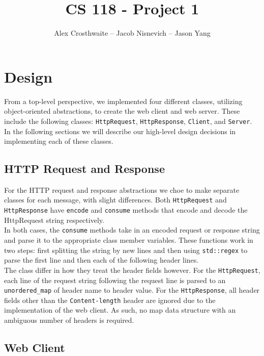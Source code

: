 \documentclass{article}
\begin{document}
\title{CS 118 - Project 1}
\author{Alex Crosthwaite -- Jacob Nisnevich -- Jason Yang}

\maketitle

\section{Design}

From a top-level perspective, we implemented four different classes, utilizing object-oriented abstractions, to create the web client and web server. These include the following classes: \texttt{HttpRequest}, \texttt{HttpResponse}, \texttt{Client}, and \texttt{Server}. In the following sections we will describe our high-level design decisions in implementing each of these classes.

\subsection{HTTP Request and Response}

For the HTTP request and response abstractions we choe to make separate classes for each message, with slight differences. Both \texttt{HttpRequest} and \texttt{HttpResponse} have \texttt{encode} and \texttt{consume} methods that encode and decode the HttpRequest string respectively. \\

\noindent
In both cases, the \texttt{consume} methods take in an encoded request or response string and parse it to the appropriate class member variables. These functions work in two steps: first splitting the string by new lines and then using \texttt{std::regex} to parse the first line and then each of the following header lines. \\

\noindent
The class differ in how they treat the header fields however. For the \texttt{HttpRequest}, each line of the request string following the request line is parsed to an \texttt{unordered\_map} of header name to header value. For the \texttt{HttpResponse}, all header fields other than the \texttt{Content-length} header are ignored due to the implementation of the web client. As such, no map data structure with an ambiguous number of headers is required.

\subsection{Web Client}
\end{document}
